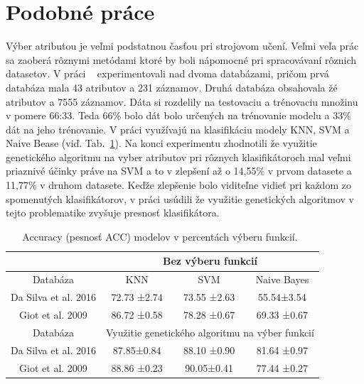 \documentclass[runningheads]{llncs}
\begin{document}
\section{Podobné práce}

Výber atributou je veľmi podstatnou časťou pri strojovom učení. Veľmi veľa prác sa 
zaoberá rôznymi metódami ktoré by boli nápomocné pri spracovávaní rôznich datasetov.
V práci ~\cite{ref_nascimento} experimentovali nad dvoma databázami, pričom 
prvá databáza mala 43 atributov a 231 záznamov. Druhá databáza obsahovala žé atributov 
a 7555 záznamov. Dáta si rozdelily na testovaciu a trénovaciu množinu v pomere 66:33. 
Teda 66\% bolo dát bolo určených na trénovanie modelu a 33\% dát na jeho trénovanie. 
V práci využívajú na klasifikáciu modely KNN, SVM a Naive Bease (viď. Tab.~\ref{tab_vyber_funkci}). Na konci experimentu zhodnotili 
že využitie genetického algoritmu na vyber atributov pri rôznych klasifikátoroch mal veľmi priaznivé
účinky práve na SVM a to v zlepšení až o 14,55\% v prvom datasete a 11,77\% v druhom datasete.
Keďže zlepšenie bolo viditeľne vidieť pri každom zo spomenutých klasifikátorov, v práci usúdili že
využitie genetických algoritmov v tejto problematike zvyšuje presnosť klasifikátora.

\begin{table}[]
\centering
\caption{Accuracy (pesnosť ACC) modelov v percentách výberu funkcií.~\cite{ref_nascimento}}\label{tab_vyber_funkci}
\begin{tabular}{|c|c|c|c|}
\hline
                        & \multicolumn{3}{c|}{Bez výberu funkcií}                              \\ \hline
Databáza             & KNN                   & SVM                   & Naive Bayes          \\ \hline
Da Silva et al. 2016 & 72.73 ±2.74           & 73.55 ±2.63           & 55.54±3.54           \\ \hline
Giot et al. 2009     & 86.72 ±0.58           & 78.28 ±0.67           & 69.33 ±0.67          \\ \hline
Databáza             & \multicolumn{3}{c|}{Využitie genetického algoritmu na výber funkcií} \\ \hline
Da Silva et al. 2016 & 87.85±0.84            & 88.10 ±0.90           & 81.64 ±0.97          \\ \hline
Giot et al. 2009     & 88.86 ±0.23           & 90.05±0.41            & 77.44 ±0.27          \\ \hline
\end{tabular}
\end{table}
\end{document}
